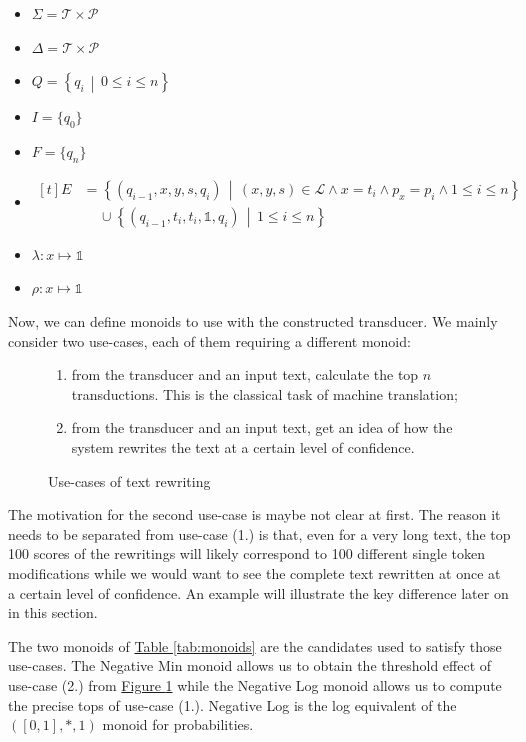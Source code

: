 \documentclass[a4paper, 11pt, onepage]{scrreprt}
\newcommand\tableref[1]{\hyperref[#1]{Table \ref*{#1}}}
\newcommand\figureref[1]{\hyperref[#1]{Figure \ref*{#1}}}
\newcommand\suchthat{\, \middle| \,}
\begin{document}
\begin{itemize}
\item $\Sigma = \mathcal{T} \times \mathcal{P}$
\item $\Delta = \mathcal{T} \times \mathcal{P}$
\item $Q = \left\{ q_i \suchthat 0 \leq i \leq n \right\}$
\item $I = \{ q_0 \}$
\item $F = \{ q_n \}$
\item $\displaystyle
  \begin{aligned}[t]
    E & = \left\{ (q_{i - 1}, x, y, s, q_i) \suchthat (x, y, s) \in
      \mathcal{L} \land x = t_i \land p_x = p_i \land 1 \leq i \leq n \right\} \\
    & \quad \, \cup \left\{ (q_{i - 1}, t_i, t_i, \mathbb{1}, q_i)
      \suchthat 1 \leq i \leq n \right\}
  \end{aligned}$
\item $\lambda : x \mapsto \mathbb{1}$
\item $\rho : x \mapsto \mathbb{1}$
\end{itemize}

Now, we can define monoids to use with the constructed transducer. We
mainly consider two use-cases, each of them requiring a different
monoid:

\begin{figure}[H]
  \centering
  \begin{enumerate}
  \item from the transducer and an input text, calculate the top $n$
    transductions. This is the classical task of machine translation;
  \item from the transducer and an input text, get an idea of how the
    system rewrites the text at a certain level of confidence.
  \end{enumerate}
  \caption{Use-cases of text rewriting}
\label{fig:use-cases}
\end{figure}

The motivation for the second use-case is maybe not clear at
first. The reason it needs to be separated from use-case (1.) is that,
even for a very long text, the top 100 scores of the rewritings will
likely correspond to 100 different single token modifications while we
would want to see the complete text rewritten at once at a certain
level of confidence. An example will illustrate the key difference
later on in this section.

The two monoids of \tableref{tab:monoids} are the candidates used to
satisfy those use-cases. The Negative Min monoid allows us to obtain
the threshold effect of use-case (2.) from \figureref{fig:use-cases}
while the Negative Log monoid allows us to compute the precise tops of
use-case (1.). Negative Log is the log equivalent of the $(\left[0,
  1\right], *, 1)$ monoid for probabilities.
\end{document}
